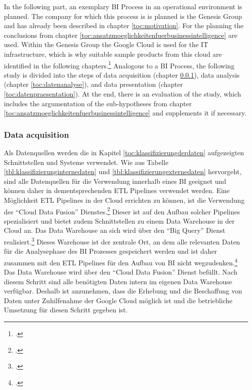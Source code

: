 In the following part, an exemplary \ac{BI} Process in an operational environment is planned. The company for which this process is
is planned is the Genesis Group and has already been described in chapter \ref{toc:motivation}. For the planning
the conclusions from chapter \ref{toc:ansatzmoeglichkeitenfuerbusinessintelligence} are used. Within the Genesis Group
the Google Cloud is used for the IT infrastructure, which is why suitable sample products from this cloud are identified in the following
chapters.\footcite[Cf.][]{googlecloud2021dw} Analogous to a \ac{BI} Process, the following study is divided into the steps of data acquisition
(chapter \ref{toc:datenhaltung}), data analysis (chapter \ref{toc:datenanalyse}), and data presentation (chapter \ref{toc:datenpraesentation}).
At the end, there is an evaluation of the study, which includes the argumentation of the sub-hypotheses from chapter
\ref{toc:ansatzmoeglichkeitenfuerbusinessintelligence} and supplements it if necessary.


\subsubsection{Data acquisition} \label{toc:datenhaltung}

Als Datenquellen werden die in Kapitel \ref{toc:klassifizierungderdaten} aufgezeigten Schnittstellen und Systeme verwendet.
Wie aus Tabelle \ref{tbl:klassifizierunginternedaten} und \ref{tbl:klassifizierungexternedaten} hervorgeht, sind alle Datenquellen für die
Verwendung innerhalb eines \ac{BI} geeignet und können daher in dementsprechenden \ac{ETL} Pipelines verwendet werden.
Eine Möglichkeit \ac{ETL} Pipelines in der Cloud errichten zu können, ist die Verwendung des "`Cloud Data Fusion"'
Dienstes.\footcite[Cf.][]{googlecloud2021dw} Dieser ist auf den Aufbau solcher Pipelines spezialisiert und bietet zudem Schnittstellen
zu einem Data Warehouse in der Cloud an. Das Data Warehouse an sich wird über den "`Big Query"' Dienst realisiert.\footcite[Cf.][]{googlecloud2021dw}
Dieses Warehouse ist der zentrale Ort, an dem alle relevanten Daten für die Analysephase des \ac{BI} Prozesses gespeichert werden und
ist daher zusammen mit den \ac{ETL} Pipelines für den Aufbau von \ac{BI} nicht wegzudenken.\footcite[Cf.][pp. 105]{loshin2012business}
Das Data Warehouse wird über den "`Cloud Data Fusion"' Dienst befüllt. Nach diesem Schritt sind alle benötigten Daten intern
im eigenen Data Warehouse verfügbar. Deshalb ist anzunehmen,
dass die Erhebung und die Beschaffung von Daten unter Zuhilfenahme der Google Cloud möglich ist und die betriebliche
Umsetzung für diesen Schritt gegeben ist.

